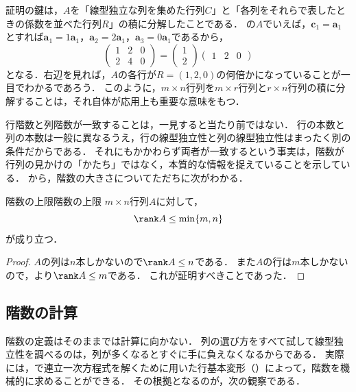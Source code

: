証明の鍵は，$A$を「線型独立な列を集めた行列$C$」と「各列をそれらで表したときの係数を並べた行列$R$」の積に分解したことである．
の$A$でいえば，$\bm{c}_1 = \bm{a}_1$とすれば$\bm{a}_1 = 1\bm{a}_1$，$\bm{a}_2 = 2\bm{a}_1$，$\bm{a}_3 = 0\bm{a}_1$であるから，
\[
  \begin{pmatrix} 1 & 2 & 0 \\ 2 & 4 & 0 \end{pmatrix}
  = \begin{pmatrix} 1 \\ 2 \end{pmatrix}
    \begin{pmatrix} 1 & 2 & 0 \end{pmatrix}
\]
となる．右辺を見れば，$A$の各行が$R = (1, 2, 0)$の何倍かになっていることが一目でわかるであろう．
このように，$m \times n$行列を$m \times r$行列と$r \times n$行列の積に分解することは，それ自体が応用上も重要な意味をもつ．

行階数と列階数が一致することは，一見すると当たり前ではない．
行の本数と列の本数は一般に異なるうえ，行の線型独立性と列の線型独立性はまったく別の条件だからである．
それにもかかわらず両者が一致するという事実は，階数が行列の見かけの「かたち」ではなく，本質的な情報を捉えていることを示している．
から，階数の大きさについてただちに次がわかる．

\begin{cor}{階数の上限}{階数の上限}
  $m \times n$行列$A$に対して，
  \[
    \rank A \le \min\{m, n\}
  \]
  が成り立つ．
\end{cor}

\begin{tleftbar}
\begin{proof}
  $A$の列は$n$本しかないので$\rank A \le n$である．
  また$A$の行は$m$本しかないので，より$\rank A \le m$である．
  これが証明すべきことであった．
\end{proof}
\end{tleftbar}

\subsection{階数の計算}

階数の定義はそのままでは計算に向かない．
列の選び方をすべて試して線型独立性を調べるのは，列が多くなるとすぐに手に負えなくなるからである．
実際には，で連立一次方程式を解くために用いた行基本変形（）によって，階数を機械的に求めることができる．
その根拠となるのが，次の観察である．

